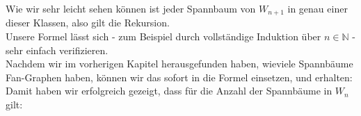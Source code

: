 Wie wir sehr leicht sehen können ist jeder Spannbaum von $W_{n+1}$ in genau einer dieser Klassen, also gilt die Rekursion.\\
Unsere Formel %
lässt sich - zum Beispiel durch vollständige Induktion über $n \in \mathbb{N}$ - sehr einfach
verifizieren.\\
Nachdem wir im vorherigen Kapitel herausgefunden haben, wieviele Spannbäume Fan-Graphen haben, können wir das sofort in die Formel einsetzen, und erhalten:\\
Damit haben wir erfolgreich gezeigt, dass für die Anzahl der Spannbäume in $W_n$ gilt:\\

